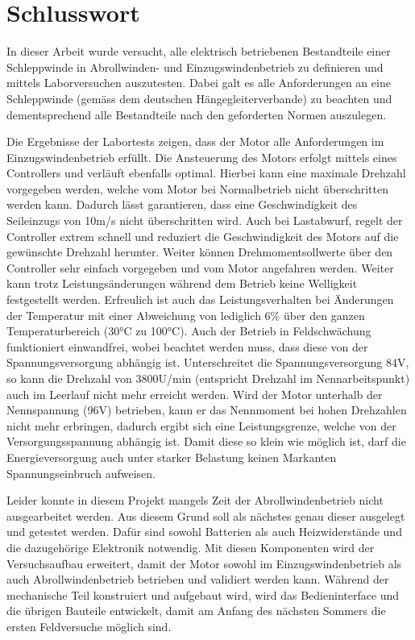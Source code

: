 \section{Schlusswort}\label{sec:Schlusswort}

In dieser Arbeit wurde versucht, alle elektrisch betriebenen Bestandteile einer Schleppwinde in Abrollwinden- und Einzugswindenbetrieb zu definieren und mittels Laborversuchen auszutesten. Dabei galt es alle Anforderungen an eine Schleppwinde (gemäss dem deutschen Hängegleiterverbande) zu beachten und dementsprechend alle Bestandteile nach den geforderten Normen auszulegen.

Die Ergebnisse der Labortests zeigen, dass der Motor alle Anforderungen im Einzugswindenbetrieb erfüllt. Die Ansteuerung des Motors erfolgt mittels eines Controllers und verläuft ebenfalls optimal. Hierbei kann eine maximale Drehzahl vorgegeben werden, welche vom Motor bei Normalbetrieb nicht überschritten werden kann. Dadurch lässt garantieren, dass eine Geschwindigkeit des Seileinzugs von 10m/s nicht überschritten wird. Auch bei Lastabwurf, regelt der Controller extrem schnell und reduziert die Geschwindigkeit des Motors auf die gewünschte Drehzahl herunter. Weiter können Drehmomentsollwerte über den Controller sehr einfach vorgegeben und vom Motor angefahren werden. Weiter kann trotz Leistungsänderungen während dem Betrieb keine Welligkeit festgestellt werden. Erfreulich ist auch das Leistungsverhalten bei Änderungen der Temperatur mit einer Abweichung von lediglich 6\% über den ganzen Temperaturbereich (30°C zu 100°C). Auch der Betrieb in Feldschwächung funktioniert einwandfrei, wobei beachtet werden muss, dass diese von der Spannungsversorgung abhängig ist. Unterschreitet die Spannungsversorgung 84V, so kann die Drehzahl von 3800U/min (entspricht Drehzahl im Nennarbeitspunkt) auch im Leerlauf nicht mehr erreicht werden. Wird der Motor unterhalb der Nennspannung (96V) betrieben, kann er das Nennmoment bei hohen Drehzahlen nicht mehr erbringen, dadurch ergibt sich eine Leistungsgrenze, welche von der Versorgungsspannung abhängig ist. Damit diese so klein wie möglich ist, darf die Energieversorgung auch unter starker Belastung keinen Markanten Spannungseinbruch aufweisen.

Leider konnte in diesem Projekt mangels Zeit der Abrollwindenbetrieb nicht ausgearbeitet werden. Aus diesem Grund soll als nächstes genau dieser ausgelegt und getestet werden. Dafür sind sowohl Batterien als auch Heizwiderstände und die dazugehörige Elektronik notwendig. Mit diesen Komponenten wird der Versuchsaufbau erweitert, damit der Motor sowohl im Einzugswindenbetrieb als auch Abrollwindenbetrieb betrieben und validiert werden kann. Während der mechanische Teil konstruiert und aufgebaut wird, wird das Bedieninterface und die übrigen Bauteile entwickelt, damit am Anfang des nächsten Sommers die ersten Feldversuche möglich sind.

